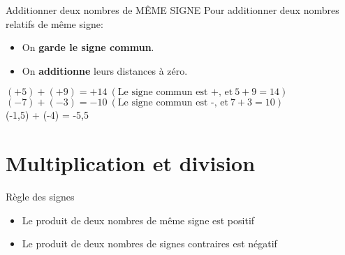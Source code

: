 \begin{propriete}{Additionner deux nombres de MÊME SIGNE}
Pour additionner deux nombres relatifs de même signe:
\begin{itemize}[label=\textbullet]
\item On \textbf{garde le signe commun}.
\item On \textbf{additionne} leurs distances à zéro.
\end{itemize}
\end{propriete}
\begin{exemple}
$(+5) + (+9) = +14 \ (\text{Le signe commun est +, et}\ 5 + 9 = 14)$\\
$(-7) + (-3) = -10 \ (\text{Le signe commun est -, et}\ 7 + 3 = 10)$\\
(-1,5) + (-4) = -5,5
\end{exemple}

\section{Multiplication et division}
\begin{methode}{Règle des signes}
\begin{itemize}
\item Le produit de deux nombres de même signe est positif
\item Le produit de deux nombres de signes contraires est négatif
\end{itemize}
\end{methode} 